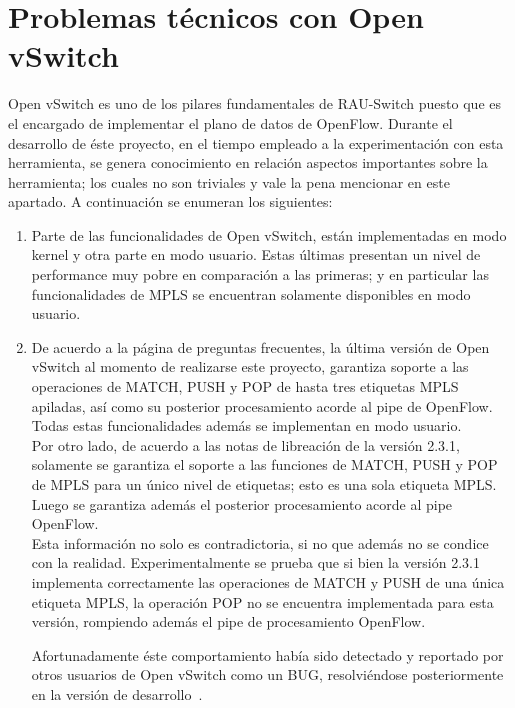 \section{Problemas t\'ecnicos con Open vSwitch}
\label{apendiceB5}

Open vSwitch es uno de los pilares fundamentales de RAU-Switch puesto que es el encargado de implementar el plano de datos de OpenFlow. Durante el desarrollo de \'este proyecto, en el tiempo empleado a la experimentaci\'on con esta herramienta, se genera conocimiento en relaci\'on aspectos importantes sobre la herramienta; los cuales no son triviales y vale la pena mencionar en este apartado. A continuaci\'on se enumeran los siguientes:\\ 

\begin{enumerate}
\item Parte de las funcionalidades de Open vSwitch, est\'an implementadas en modo kernel y otra parte en modo usuario. Estas \'ultimas presentan un nivel de performance muy pobre en comparaci\'on a las primeras; y en particular las funcionalidades de MPLS se encuentran solamente disponibles en modo usuario.

\item De acuerdo a la p\'agina de preguntas frecuentes, la \'ultima versi\'on de Open vSwitch al momento de realizarse este proyecto, garantiza soporte a las operaciones de MATCH, PUSH y POP de hasta tres etiquetas MPLS apiladas, as\'i como su posterior procesamiento acorde al pipe de OpenFlow. Todas estas funcionalidades adem\'as se implementan en modo usuario.\\

Por otro lado, de acuerdo  a las notas de libreaci\'on de la versi\'on 2.3.1, solamente se garantiza el soporte a las funciones de MATCH, PUSH y POP de MPLS para un \'unico nivel de etiquetas; esto es una sola etiqueta MPLS. Luego se garantiza adem\'as el posterior procesamiento acorde al pipe OpenFlow.\\

Esta informaci\'on no solo es contradictoria, si no que adem\'as no se condice con la realidad. Experimentalmente se prueba que si bien la versi\'on 2.3.1 implementa correctamente las operaciones de MATCH y PUSH de una \'unica etiqueta MPLS, la operaci\'on POP no se encuentra implementada para esta versi\'on, rompiendo adem\'as el pipe de procesamiento OpenFlow. 

Afortunadamente \'este comportamiento hab\'ia sido detectado y reportado por otros usuarios de Open vSwitch como un BUG, resolviéndose posteriormente en la versi\'on de desarrollo~\citep{OVSSourceCode}.


\end{enumerate}
